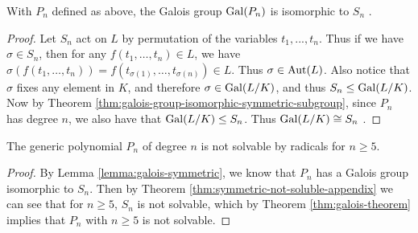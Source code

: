 \begin{lemma}\label{lemma:galois-symmetric}
	With $P_n$ defined as above, the Galois group $\operatorname{Gal}(P_n)$ is isomorphic to $S_n$ .
\end{lemma}

\begin{proof}
	
	Let $S_n$ act on $L$ by permutation of the variables $t_1,...,t_n$. Thus if we have $\sigma \in S_n$, then for any $f(t_1,\dots,t_n) \in L $, we have 
	$   \sigma( f(t_1, \dots, t_n) )=f( t_{\sigma(1)},\dots,t_{\sigma(n)}) \in L. $
	Thus $\sigma \in \operatorname{Aut}(L)$.  Also notice that $\sigma$ fixes any element in $K$, and therefore
	 $\sigma \in \operatorname{Gal}(L/K)$, and thus $S_n \le \operatorname{Gal}(L/K)$.  Now by Theorem \ref{thm:galois-group-isomorphic-symmetric-subgroup}, since $P_n$ has degree $n$, we also have that $\operatorname{Gal}(L/K) \le S_n$. Thus $\operatorname{Gal}(L/K) \cong S_n$ . 
%	
\end{proof}


\begin{theorem}\label{thm:abel-ruffini-thm}
	The generic polynomial $P_n$ of degree $n$ is not solvable by radicals for $n \geq 5$. 
\end{theorem}

\begin{proof}
	By Lemma \ref{lemma:galois-symmetric}, we know that $P_n$ has a Galois group isomorphic to $S_n$. Then by Theorem \ref{thm:symmetric-not-soluble-appendix} we can see that for $n \geq 5$, $S_n$ is not solvable, which by Theorem \ref{thm:galois-theorem} implies that $P_n$ with $n \ge 5$ is not solvable.
\end{proof}


